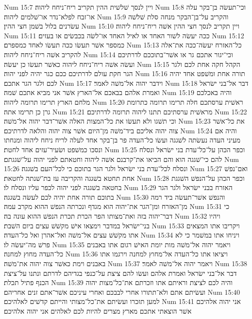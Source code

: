 Num 15:7  ויין לנסך שׁלשׁית ההין תקריב ריח־ניחח ליהוה׃
Num 15:8  וכי־תעשׂה בן־בקר עלה או־זבח לפלא־נדר או־שׁלמים ליהוה׃
Num 15:9  והקריב על־בן־הבקר מנחה סלת שׁלשׁה עשׂרנים בלול בשׁמן חצי ההין׃
Num 15:10  ויין תקריב לנסך חצי ההין אשׁה ריח־ניחח ליהוה׃
Num 15:11  ככה יעשׂה לשׁור האחד או לאיל האחד או־לשׂה בכבשׂים או בעזים׃
Num 15:12  כמספר אשׁר תעשׂו ככה תעשׂו לאחד כמספרם׃
Num 15:13  כל־האזרח יעשׂה־ככה את־אלה להקריב אשׁה ריח־ניחח ליהוה׃
Num 15:14  וכי־יגור אתכם גר או אשׁר־בתוככם לדרתיכם ועשׂה אשׁה ריח־ניחח ליהוה כאשׁר תעשׂו כן יעשׂה׃
Num 15:15  הקהל חקה אחת לכם ולגר הגר חקת עולם לדרתיכם ככם כגר יהיה לפני יהוה׃
Num 15:16  תורה אחת ומשׁפט אחד יהיה לכם ולגר הגר אתכם׃
Num 15:17  וידבר יהוה אל־משׁה לאמר׃
Num 15:18  דבר אל־בני ישׂראל ואמרת אלהם בבאכם אל־הארץ אשׁר אני מביא אתכם שׁמה׃
Num 15:19  והיה באכלכם מלחם הארץ תרימו תרומה ליהוה׃
Num 15:20  ראשׁית ערסתכם חלה תרימו תרומה כתרומת גרן כן תרימו אתה׃
Num 15:21  מראשׁית ערסתיכם תתנו ליהוה תרומה לדרתיכם׃
Num 15:22  וכי תשׁגו ולא תעשׂו את כל־המצות האלה אשׁר־דבר יהוה אל־משׁה׃
Num 15:23  את כל־אשׁר צוה יהוה אליכם ביד־משׁה מן־היום אשׁר צוה יהוה והלאה לדרתיכם׃
Num 15:24  והיה אם מעיני העדה נעשׂתה לשׁגגה ועשׂו כל־העדה פר בן־בקר אחד לעלה לריח ניחח ליהוה ומנחתו ונסכו כמשׁפט ושׂעיר־עזים אחד לחטת׃
Num 15:25  וכפר הכהן על־כל־עדת בני ישׂראל ונסלח להם כי־שׁגגה הוא והם הביאו את־קרבנם אשׁה ליהוה וחטאתם לפני יהוה על־שׁגגתם׃
Num 15:26  ונסלח לכל־עדת בני ישׂראל ולגר הגר בתוכם כי לכל־העם בשׁגגה׃
Num 15:27  ואם־נפשׁ אחת תחטא בשׁגגה והקריבה עז בת־שׁנתה לחטאת׃
Num 15:28  וכפר הכהן על־הנפשׁ השׁגגת בחטאה בשׁגגה לפני יהוה לכפר עליו ונסלח לו׃
Num 15:29  האזרח בבני ישׂראל ולגר הגר בתוכם תורה אחת יהיה לכם לעשׂה בשׁגגה׃
Num 15:30  והנפשׁ אשׁר־תעשׂה ביד רמה מן־האזרח ומן־הגר את־יהוה הוא מגדף ונכרתה הנפשׁ ההוא מקרב עמה׃
Num 15:31  כי דבר־יהוה בזה ואת־מצותו הפר הכרת תכרת הנפשׁ ההוא עונה בה׃
Num 15:32  ויהיו בני־ישׂראל במדבר וימצאו אישׁ מקשׁשׁ עצים ביום השׁבת׃
Num 15:33  ויקריבו אתו המצאים אתו מקשׁשׁ עצים אל־משׁה ואל־אהרן ואל כל־העדה׃
Num 15:34  ויניחו אתו במשׁמר כי לא פרשׁ מה־יעשׂה לו׃
Num 15:35  ויאמר יהוה אל־משׁה מות יומת האישׁ רגום אתו באבנים כל־העדה מחוץ למחנה׃
Num 15:36  ויציאו אתו כל־העדה אל־מחוץ למחנה וירגמו אתו באבנים וימת כאשׁר צוה יהוה את־משׁה׃
Num 15:37  ויאמר יהוה אל־משׁה לאמר׃
Num 15:38  דבר אל־בני ישׂראל ואמרת אלהם ועשׂו להם ציצת על־כנפי בגדיהם לדרתם ונתנו על־ציצת הכנף פתיל תכלת׃
Num 15:39  והיה לכם לציצת וראיתם אתו וזכרתם את־כל־מצות יהוה ועשׂיתם אתם ולא־תתורו אחרי לבבכם ואחרי עיניכם אשׁר־אתם זנים אחריהם׃
Num 15:40  למען תזכרו ועשׂיתם את־כל־מצותי והייתם קדשׁים לאלהיכם׃
Num 15:41  אני יהוה אלהיכם אשׁר הוצאתי אתכם מארץ מצרים להיות לכם לאלהים אני יהוה אלהיכם׃
